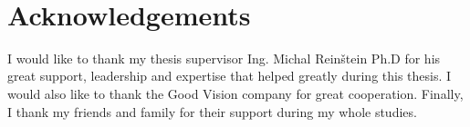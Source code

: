 ~\vfill{}

\section*{Acknowledgements}
I would like to thank my thesis supervisor Ing. Michal Reinštein Ph.D for his great support, leadership and expertise that helped greatly during this thesis. I would also like to thank the Good Vision company for great cooperation. Finally, I thank my friends and family for their support during my whole studies.
\vspace{2.5cm}

\newpage{}
